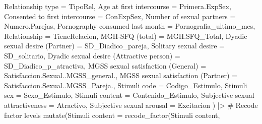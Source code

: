 \documentclass[
  bookmarksnumbered]{article}
\newenvironment{Shaded}{\begin{snugshade}}{\end{snugshade}}
\newcommand{\AttributeTok}[1]{\textcolor[rgb]{0.80,0.80,0.80}{#1}}
\newcommand{\CommentTok}[1]{\textcolor[rgb]{0.50,0.62,0.50}{#1}}
\newcommand{\FunctionTok}[1]{\textcolor[rgb]{0.94,0.94,0.56}{#1}}
\newcommand{\NormalTok}[1]{\textcolor[rgb]{0.80,0.80,0.80}{#1}}
\newcommand{\OtherTok}[1]{\textcolor[rgb]{0.94,0.94,0.56}{#1}}
\newcommand{\SpecialCharTok}[1]{\textcolor[rgb]{0.86,0.64,0.64}{#1}}
\newcommand{\StringTok}[1]{\textcolor[rgb]{0.80,0.58,0.58}{#1}}
\begin{document}
\begin{Shaded}
\begin{Highlighting}[]
    \StringTok{\textasciigrave{}}\AttributeTok{Relationship type}\StringTok{\textasciigrave{}} \OtherTok{=}\NormalTok{ TipoRel,}
    \StringTok{\textasciigrave{}}\AttributeTok{Age at first intercourse}\StringTok{\textasciigrave{}} \OtherTok{=}\NormalTok{ Primera.ExpSex,}
    \StringTok{\textasciigrave{}}\AttributeTok{Consented to first intercourse}\StringTok{\textasciigrave{}} \OtherTok{=}\NormalTok{ ConExpSex,}
    \StringTok{\textasciigrave{}}\AttributeTok{Number of sexual partners}\StringTok{\textasciigrave{}} \OtherTok{=}\NormalTok{ Numero.Parejas,}
    \StringTok{\textasciigrave{}}\AttributeTok{Pornography consumed last month}\StringTok{\textasciigrave{}} \OtherTok{=}\NormalTok{ Pornografia\_ultimo\_mes,}
    \AttributeTok{Relationship =}\NormalTok{ TieneRelacion,}
    \StringTok{\textasciigrave{}}\AttributeTok{MGH{-}SFQ (total)}\StringTok{\textasciigrave{}} \OtherTok{=}\NormalTok{ MGH.SFQ\_Total,}
    \StringTok{\textasciigrave{}}\AttributeTok{Dyadic sexual desire (Partner)}\StringTok{\textasciigrave{}} \OtherTok{=}\NormalTok{ SD\_Diadico\_pareja,}
    \StringTok{\textasciigrave{}}\AttributeTok{Solitary sexual desire}\StringTok{\textasciigrave{}} \OtherTok{=}\NormalTok{ SD\_solitario,}
    \StringTok{\textasciigrave{}}\AttributeTok{Dyadic sexual desire (Attractive person)}\StringTok{\textasciigrave{}} \OtherTok{=}\NormalTok{ SD\_Diadico\_p\_atractiva,}
    \StringTok{\textasciigrave{}}\AttributeTok{MGSS sexual satisfaction (General)}\StringTok{\textasciigrave{}} \OtherTok{=}\NormalTok{ Satisfaccion.Sexual..MGSS\_general.,}
    \StringTok{\textasciigrave{}}\AttributeTok{MGSS sexual satisfaction (Partner)}\StringTok{\textasciigrave{}} \OtherTok{=}\NormalTok{ Satisfaccion.Sexual..MGSS\_Pareja.,}
    \StringTok{\textasciigrave{}}\AttributeTok{Stimuli code}\StringTok{\textasciigrave{}} \OtherTok{=}\NormalTok{ Codigo\_Estimulo,}
    \StringTok{\textasciigrave{}}\AttributeTok{Stimuli sex}\StringTok{\textasciigrave{}} \OtherTok{=}\NormalTok{ Sexo\_Estimulo,}
    \StringTok{\textasciigrave{}}\AttributeTok{Stimuli content}\StringTok{\textasciigrave{}} \OtherTok{=}\NormalTok{ Contenido\_Estimulo,}
    \StringTok{\textasciigrave{}}\AttributeTok{Subjective sexual attractiveness}\StringTok{\textasciigrave{}} \OtherTok{=}\NormalTok{ Atractivo,}
    \StringTok{\textasciigrave{}}\AttributeTok{Subjective sexual arousal}\StringTok{\textasciigrave{}} \OtherTok{=}\NormalTok{ Excitacion}
\NormalTok{  ) }\SpecialCharTok{|\textgreater{}}
  \CommentTok{\# Recode factor levels}
  \FunctionTok{mutate}\NormalTok{(}\StringTok{\textasciigrave{}}\AttributeTok{Stimuli content}\StringTok{\textasciigrave{}} \OtherTok{=} \FunctionTok{recode\_factor}\NormalTok{(}\StringTok{\textasciigrave{}}\AttributeTok{Stimuli content}\StringTok{\textasciigrave{}}\NormalTok{,}

\end{Highlighting}
\end{Shaded}
\end{document}
